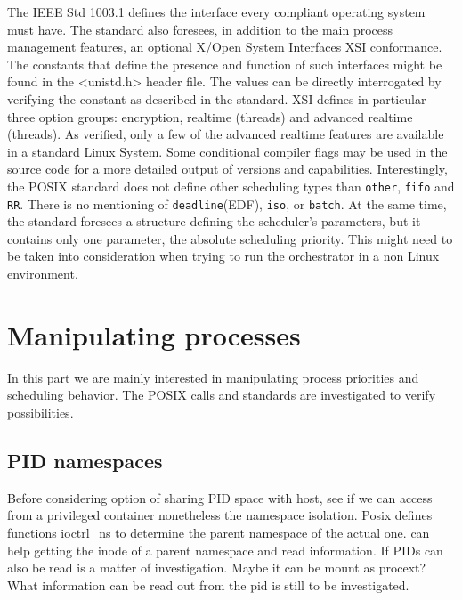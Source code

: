 \documentclass[]{scrartcl}
\begin{document}
The IEEE Std 1003.1 defines the interface every compliant operating system must have.
The standard also foresees, in addition to the main process management features, an optional X/Open System Interfaces XSI conformance.
The constants that define the presence and function of such interfaces might be found in the <unistd.h> header file. 
The values can be directly interrogated by verifying the constant as described in the standard.
XSI defines in particular three option groups: encryption, realtime (threads) and advanced realtime (threads). 
As verified, only a few of the advanced realtime features are available in a standard Linux System. 
Some conditional compiler flags may be used in the source code for a more detailed output of versions and capabilities. 
Interestingly, the POSIX standard does not define other scheduling types than \texttt{other}, \texttt{fifo} and \texttt{RR}. 
There is no mentioning of \texttt{deadline}(EDF), \texttt{iso}, or \texttt{batch}. 
At the same time, the standard foresees a structure defining the scheduler's parameters, but it contains only one parameter, the absolute scheduling priority.
This might need to be taken into consideration when trying to run the orchestrator in a non Linux environment.


\section{Manipulating processes}
\label{sec:mgmttest}

In this part we are mainly interested in manipulating process priorities and scheduling behavior. 
The POSIX calls and standards are investigated to verify possibilities.

\subsection{PID namespaces}

Before considering option of sharing PID space with host, see if we can access from a privileged container nonetheless the namespace isolation. 
Posix defines functions ioctrl\_ns to determine the parent namespace of the actual one. can help getting the inode of a parent namespace and read information. 
If PIDs can also be read is a matter of investigation. Maybe it can be mount as \/procext?
What information can be read out from the pid is still to be investigated.
\end{document}

